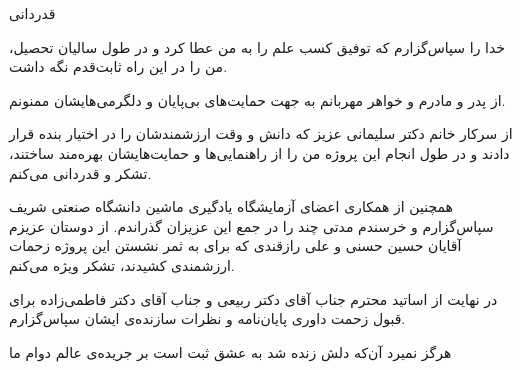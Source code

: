 \thispagestyle{empty}

{\fontsize{20}{1}\nastaliq
 قدردانی

 \vspace{10pt}
خدا را سپاس‌گزارم که توفیق کسب علم را به من عطا کرد و در طول سالیان تحصیل، من را در این راه ثابت‌قدم نگه داشت.

 \vspace{10pt}
از پدر و مادرم و خواهر مهربانم به جهت حمایت‌های بی‌پایان و دلگرمی‌هایشان ممنونم.

 \vspace{10pt}
از سرکار خانم دکتر سلیمانی عزیز که دانش و وقت ارزشمندشان را در اختیار بنده قرار دادند و در طول انجام این پروژه من را از راهنمایی‌ها و حمایت‌هایشان بهره‌مند ساختند، تشکر و قدردانی می‌کنم.

 \vspace{10pt}
همچنین از همکاری اعضای آزمایشگاه یادگیری ماشین دانشگاه صنعتی شریف سپاس‌گزارم و خرسندم مدتی چند را در جمع این عزیزان گذراندم. از دوستان عزیزم آقایان حسین حسنی و علی رازقندی که برای به ثمر نشستن این پروژه زحمات ارزشمندی کشیدند، تشکر ویژه می‌کنم.

 \vspace{10pt}
در نهایت از اساتید محترم جناب آقای دکتر ربیعی و جناب آقای دکتر فاطمی‌زاده برای قبول زحمت داوری پایان‌نامه و نظرات سازنده‌ی ایشان سپاس‌گزارم.

 \vspace{10pt}
هرگز نمیرد آن‌که دلش زنده شد به عشق		\hspace{55pt}
ثبت است بر جریده‌ی عالم دوام ما
}\\[2cm]
\newpage\clearpage